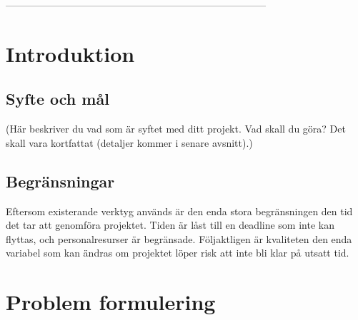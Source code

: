 \documentclass[11pt,a4paper,oneside]{book}
\begin{document}








\tableofcontents

\mainmatter
 ------------------------------------------------------------------------------
\section{Introduktion}


\subsection{Syfte och mål} %
(Här beskriver du vad som är syftet med ditt projekt. Vad skall du göra? Det skall vara kortfattat (detaljer kommer i senare avsnitt).)


\subsection{Begränsningar} %
Eftersom existerande verktyg används är den enda stora begränsningen den tid det tar att genomföra 
projektet. Tiden är låst till en deadline som inte kan flyttas, och personalresurser är begränsade. 
Följaktligen är kvaliteten den enda variabel som kan ändras om projektet löper risk att inte bli klar 
på utsatt tid.
\newpage
\section{Problem formulering}

\newpage
\end{document}
